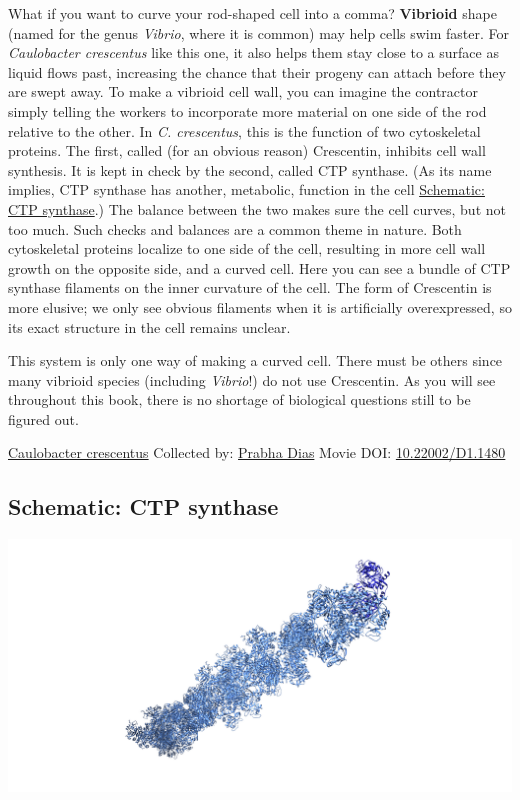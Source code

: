 \documentclass[]{tufte-book}
\begin{document}
What if you want to curve your rod-shaped cell into a comma? \textbf{Vibrioid} shape (named for the genus \emph{Vibrio}, where it is common) may help cells swim faster. For \emph{Caulobacter crescentus} like this one, it also helps them stay close to a surface as liquid flows past, increasing the chance that their progeny can attach before they are swept away. To make a vibrioid cell wall, you can imagine the contractor simply telling the workers to incorporate more material on one side of the rod relative to the other. In \emph{C. crescentus}, this is the function of two cytoskeletal proteins. The first, called (for an obvious reason) Crescentin, inhibits cell wall synthesis. It is kept in check by the second, called CTP synthase. (As its name implies, CTP synthase has another, metabolic, function in the cell \protect\hyperlink{CTP_synthase}{Schematic: CTP synthase}.) The balance between the two makes sure the cell curves, but not too much. Such checks and balances are a common theme in nature. Both cytoskeletal proteins localize to one side of the cell, resulting in more cell wall growth on the opposite side, and a curved cell. Here you can see a bundle of CTP synthase filaments on the inner curvature of the cell. The form of Crescentin is more elusive; we only see obvious filaments when it is artificially overexpressed, so its exact structure in the cell remains unclear.

This system is only one way of making a curved cell. There must be others since many vibrioid species (including \emph{Vibrio}!) do not use Crescentin. As you will see throughout this book, there is no shortage of biological questions still to be figured out.



\hypertarget{htmlwidget-83c4482b26e9588f9755}{}

\label{fig:3-4}\protect\hyperlink{tree}{Caulobacter crescentus} Collected by: \protect\hyperlink{prabha_dias}{Prabha Dias} Movie DOI: \href{https://doi.org/10.22002/D1.1480}{10.22002/D1.1480}

\hypertarget{CTP_synthase}{%
\subsection*{Schematic: CTP synthase}\label{CTP_synthase}}

\includegraphics{img/schematics/3_4_1}
\end{document}
